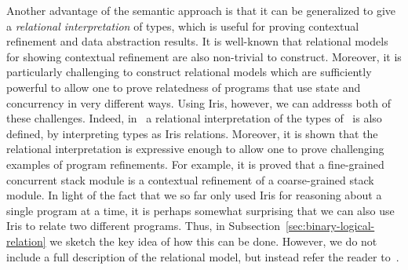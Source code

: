 Another advantage of the semantic approach is that it can be
generalized to give a \emph{relational interpretation} of types, which
is useful for proving contextual refinement and data abstraction results.
It is well-known that relational models for showing contextual refinement are also
non-trivial to construct. Moreover, it is particularly challenging to
construct relational models which are sufficiently powerful to allow
one to prove relatedness of programs that use state and concurrency in
very different ways. Using Iris, however, we can addresss both of
these challenges. Indeed, in~\cite{timany:logrel-in-iris} a relational
interpretation of the types of \TheLang\ is also defined, by
interpreting types as Iris relations. Moreover, it is shown that the
relational interpretation is expressive enough to allow one to prove
challenging examples of program refinements. For example, it is proved
that a fine-grained concurrent stack module is a contextual refinement of a
coarse-grained stack module. 
In light of the fact that we so far only used Iris for reasoning about a
single program at a time, it is perhaps somewhat surprising that we can also
use Iris to relate two different programs.  Thus, in
Subsection~\ref{sec:binary-logical-relation} we sketch the key idea of
how this can be done. 
However, we do not include a full description of the relational
model, but instead refer the reader to~\cite{timany:logrel-in-iris}. 


